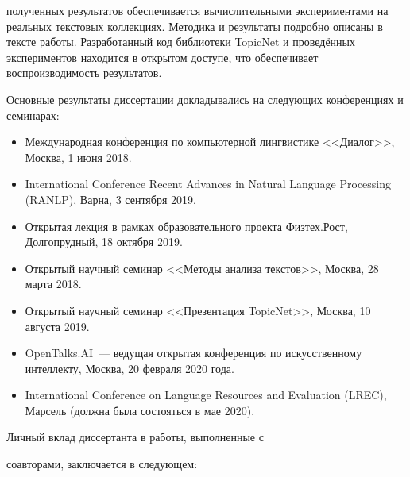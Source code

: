 {\reliability} полученных результатов обеспечивается вычислительными экспериментами на реальных текстовых коллекциях. Методика и результаты подробно описаны в тексте работы. Разработанный код библиотеки TopicNet и проведённых экспериментов находится в открытом доступе, что обеспечивает воспроизводимость результатов.

{\probation}

Основные результаты диссертации докладывались на следующих конференциях и семинарах:

\begin{itemize}

    \item Международная конференция по компьютерной лингвистике <<Диалог>>, Москва, 1 июня 2018.

    \item International Conference Recent Advances in Natural Language Processing (RANLP), Варна, 3 сентября 2019.

    \item Открытая лекция в рамках образовательного проекта Физтех.Рост, Долгопрудный, 18 октября 2019.

    \item Открытый научный семинар <<Методы анализа текстов>>, Москва, 28 марта 2018.

    \item Открытый научный семинар <<Презентация TopicNet>>, Москва, 10 августа 2019.

    \item OpenTalks.AI~--- ведущая открытая конференция по искусственному интеллекту, Москва, 20 февраля 2020 года.

    \item International Conference on Language Resources and Evaluation (LREC), Марсель (должна была состояться в мае 2020).

\end{itemize}

{\contribution} Личный вклад диссертанта в работы, выполненные с

соавторами, заключается в следующем:

